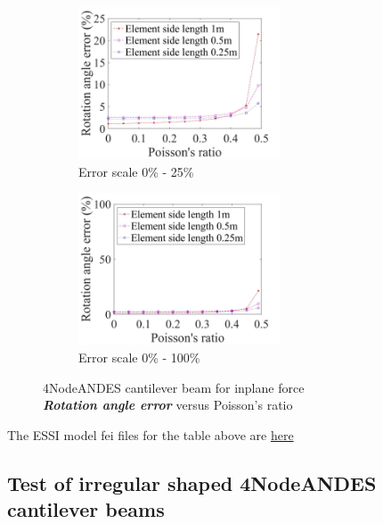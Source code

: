 \documentclass[fleqn,11pt]{article}
\begin{document}
\begin{figure}[H]
  \begin{subfigure}{0.5\textwidth}
    \centering
    \includegraphics[width=6cm]{../Figure-files/error4andes_beam_dif_poisson_angle_inplane_div.jpeg}
    \caption{Error scale 0\% - 25\%}
  \end{subfigure}
  \begin{subfigure}{0.5\textwidth}
    \centering
    \includegraphics[width=6cm]{../Figure-files/error4andes_beam_dif_poisson_angle_inplane_div100.jpeg}
    \caption{Error scale 0\% - 100\%}
  \end{subfigure}
  \captionsetup{justification=centering,margin=2cm}
  \caption{4NodeANDES cantilever beam for inplane force\\
      \emph{\textbf{Rotation angle error}}   versus   Poisson's ratio}
  \label{table angle error 4NodeANDES cantilever beam for different Poisson ratio 2}
\end{figure}



The ESSI model fei files for the table above are \href{https://github.com/yuan-energy/ESSI_Verification/blob/master/4NodeANDES/cantilever_different_Poisson/cantilever_different_Poisson.tar.gz?raw=true}{here}






\newpage
\subsection{Test of irregular shaped 4NodeANDES cantilever beams}
\end{document}
